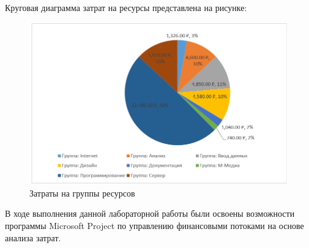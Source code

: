 Круговая диаграмма затрат на ресурсы представлена на рисунке:
\FloatBarrier
\begin{figure}[h]	
	\begin{center}
		\includegraphics[height=7cm]{inc/result2.png}
	\end{center}
	\captionsetup{justification=centering}
	\caption{Затраты на группы ресурсов}
\end{figure}
\FloatBarrier 

В ходе выполнения данной лабораторной работы были освоены возможности программы Microsoft Project по управлению финансовыми потоками на основе анализа затрат.